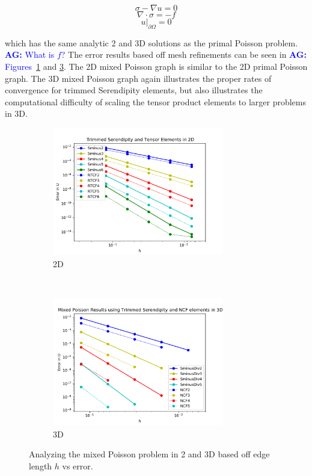 \documentclass[manuscript,screen]{acmart}
\newcommand{\akg}[1]{\textcolor{blue}{\textbf{AG:} #1}}
\begin{document}
\begin{equation}
    \sigma - \nabla u = 0
\end{equation}
\begin{equation*}
    \nabla \cdot \sigma = -f
\end{equation*}
\begin{equation*}
    u\vert_{\partial \Omega} = 0
\end{equation*}

\noindent which has the same analytic 2 and 3D solutions as the primal Poisson problem. 
\akg{What is $f$?}
The error results based off mesh refinements can be seen in \akg{Figures}~\ref{fig:2dMixedPoissonH} and \ref{fig:3dMixedPoissonH}.  The 2D mixed Poisson graph is similar to the 2D primal Poisson graph.  The 3D mixed Poisson graph again illustrates the proper rates of convergence for trimmed Serendipity elements, but also illustrates the computational difficulty of scaling the tensor product elements to larger problems in 3D.

\begin{figure}[h!]
  \centering
  \begin{subfigure}[h]{0.5\textwidth}
    \centering
    \includegraphics[height=2.2in]{2dMixedPoissonH.pdf}
    \caption{2D}
    \label{fig:2dMixedPoissonH}
  \end{subfigure}
  ~
  \begin{subfigure}[h]{0.5\textwidth}
    \centering
    \includegraphics[height=2.2in]{3dMixedPoissonH.pdf}
    \caption{3D}
    \label{fig:3dMixedPoissonH}
  \end{subfigure}
  \caption{Analyzing the mixed Poisson problem in 2 and 3D based off edge length $h$ vs error.}
\end{figure} 
\end{document}
